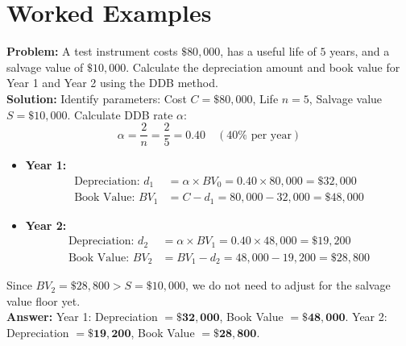 \documentclass[12pt,a4paper]{article}
\begin{document}
\section{Worked Examples}

\begin{tcolorbox}[examplebox, title={Example 1: Double Declining Balance (DDB)}]
\textbf{Problem:} A test instrument costs $\$80,000$, has a useful life of $5$ years, and a salvage value of $\$10,000$. Calculate the depreciation amount and book value for Year 1 and Year 2 using the DDB method.\\[4pt]
\textbf{Solution:}
Identify parameters: Cost $C = \$80,000$, Life $n = 5$, Salvage value $S = \$10,000$.
Calculate DDB rate $\alpha$:
\begin{equation*}
  \alpha = \frac{2}{n} = \frac{2}{5} = 0.40 \quad (40\% \text{ per year})
\end{equation*}
\begin{itemize}[leftmargin=*, itemsep=8pt]
  \item \textbf{Year 1:}
    \begin{align*}
      \text{Depreciation: } d_1 &= \alpha \times BV_0 = 0.40 \times 80,000 = \$32,000 \\
      \text{Book Value: } BV_1 &= C - d_1 = 80,000 - 32,000 = \$48,000
    \end{align*}
  \item \textbf{Year 2:}
    \begin{align*}
      \text{Depreciation: } d_2 &= \alpha \times BV_1 = 0.40 \times 48,000 = \$19,200 \\
      \text{Book Value: } BV_2 &= BV_1 - d_2 = 48,000 - 19,200 = \$28,800
    \end{align*}
\end{itemize}
Since $BV_2 = \$28,800 > S = \$10,000$, we do not need to adjust for the salvage value floor yet.\\[4pt]
\textbf{Answer:} Year 1: Depreciation $= \mathbf{\$32,000}$, Book Value $= \mathbf{\$48,000}$. Year 2: Depreciation $= \mathbf{\$19,200}$, Book Value $= \mathbf{\$28,800}$.
\end{tcolorbox}
\end{document}
